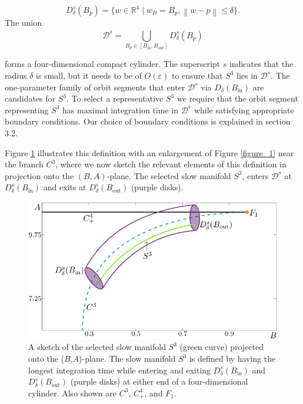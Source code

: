 \documentclass{ws-ijbc}
\begin{document}
\begin{equation*}
D^s_\delta(B_p)=\{w \in \mathbb{R}^4 \; | \; w_B = B_p, \left\lVert w-p \right\rVert \leq \delta\}.
\end{equation*}    
\noindent
The union 
\begin{equation*}
\mathscr{D}^s = \bigcup\limits_{B_p \in [B_{\mathrm{in}}, B_{\mathrm{out}}]}^{} D^s_\delta(B_p)
\end{equation*}


\noindent
forms a four-dimensional compact cylinder.  The superscript $s$ indicates that the radius $\delta$ is small, but it needs to be of $O(\varepsilon)$ to ensure that $S^3$ lies in $\mathscr{D}^s$.  The one-parameter family of orbit segments that enter $\mathscr{D}^s$ via $D_\delta(B_{\mathrm{in}})$ are candidates for $S^3$.   To select a representative $S^3$ we require that the orbit segment representing $S^3$ has maximal integration time in $\mathscr{D}^s$ while satisfying appropriate boundary conditions.  Our choice of boundary conditions is explained in section 3.2.
    
Figure \ref{figure_2} illustrates this definition with an enlargement of Figure \ref{figure_1} near the branch $C^3$, where we now sketch the relevant elements of this definition in projection onto the $(B,A)$-plane. The selected slow manifold $S^3$, enters $\mathscr{D}^s$ at $D^s_\delta(B_{\mathrm{in}})$ and exits at $D^s_\delta(B_{\mathrm{out}})$ (purple disks).

\begin{figure}[!t]
\begin{center}
\includegraphics{./figures/MKMO_2.pdf}
\end{center}
\caption{A sketch of the selected slow manifold $S^3$ (green curve) projected onto the ($B$,$A$)-plane.  The slow manifold $S^3$ is defined by having the longest integration time while entering and exiting  $D^s_\delta(B_{\mathrm{in}})$ and $D^s_\delta(B_{\mathrm{out}})$ (purple disks) at either end of a four-dimensional cylinder.  Also shown are $C^3$, $C^4_+$, and $F_1$.}
\label{figure_2}
\end{figure}
\end{document}
